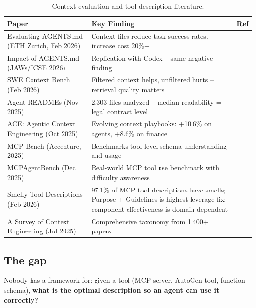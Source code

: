 \begin{table}[H]
\centering
\small
\caption{Context evaluation and tool description literature.}
\label{tab:context-lit}
\begin{tabular}{p{4.5cm}p{7.5cm}l}
\toprule
\textbf{Paper} & \textbf{Key Finding} & \textbf{Ref} \\
\midrule
Evaluating AGENTS.md (ETH Zurich, Feb 2026) & Context files reduce task success rates, increase cost 20\%+ & \cite{evaluatingAgentsMd2026} \\
\addlinespace
Impact of AGENTS.md (JAWs/ICSE 2026) & Replication with Codex -- same negative finding & \cite{impactAgentsMd2026} \\
\addlinespace
SWE Context Bench (Feb 2026) & Filtered context helps, unfiltered hurts -- retrieval quality matters & \cite{sweContextBench2026} \\
\addlinespace
Agent READMEs (Nov 2025) & 2,303 files analyzed -- median readability = legal contract level & \cite{agentReadmes2025} \\
\addlinespace
ACE: Agentic Context Engineering (Oct 2025) & Evolving context playbooks: +10.6\% on agents, +8.6\% on finance & \cite{ace2025} \\
\addlinespace
MCP-Bench (Accenture, 2025) & Benchmarks tool-level schema understanding and usage & \cite{mcpBench2025} \\
\addlinespace
MCPAgentBench (Dec 2025) & Real-world MCP tool use benchmark with difficulty awareness & \cite{mcpAgentBench2025} \\
\addlinespace
Smelly Tool Descriptions (Feb 2026) & 97.1\% of MCP tool descriptions have smells; Purpose + Guidelines is highest-leverage fix; component effectiveness is domain-dependent & \cite{smellyToolDesc2026} \\
\addlinespace
A Survey of Context Engineering (Jul 2025) & Comprehensive taxonomy from 1,400+ papers & \cite{contextEngineeringSurvey2025} \\
\bottomrule
\end{tabular}
\end{table}

\subsection{The gap}

Nobody has a framework for: given a tool (MCP server, AutoGen tool, function schema), \textbf{what is the optimal description so an agent can use it correctly?}

